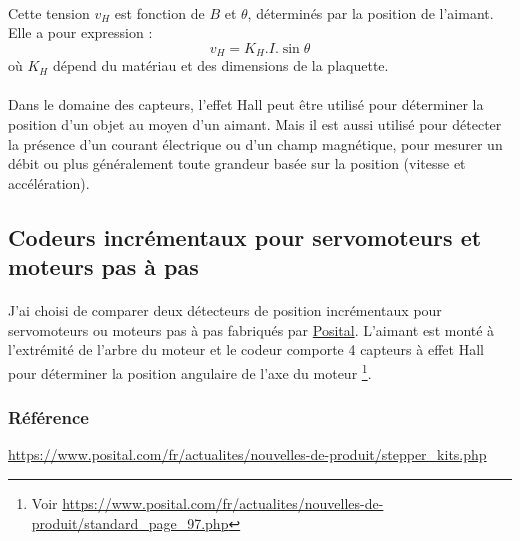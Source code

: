 \documentclass{article}
\begin{document}
    \paragraph{}
    Cette tension $v_H$ est fonction de $B$ et $\theta$, déterminés par la position de l'aimant. Elle a pour expression : $$v_H = K_H . I . \sin\theta$$ où $K_H$ dépend du matériau et des dimensions de la plaquette.
        
    \paragraph{}
    Dans le domaine des capteurs, l'effet Hall peut être utilisé pour déterminer la position d'un objet au moyen d'un aimant. Mais il est aussi utilisé pour détecter la présence d'un courant électrique ou d'un champ magnétique, pour mesurer un débit ou plus généralement toute grandeur basée sur la position (vitesse et accélération).
            
    \subsection{Codeurs incrémentaux pour servomoteurs et moteurs pas à pas}
    \paragraph{}
    J'ai choisi de comparer deux détecteurs de position incrémentaux pour servomoteurs ou moteurs pas à pas fabriqués par \href{https://www.posital.com/fr/}{Posital}. L'aimant est monté à l'extrémité de l'arbre du moteur et le codeur comporte 4 capteurs à effet Hall pour déterminer la position angulaire de l'axe du moteur \footnote{Voir \url{https://www.posital.com/fr/actualites/nouvelles-de-produit/standard_page_97.php}}.
            
    \subsubsection{Référence}
    \url{https://www.posital.com/fr/actualites/nouvelles-de-produit/stepper_kits.php}
        
\end{document}
